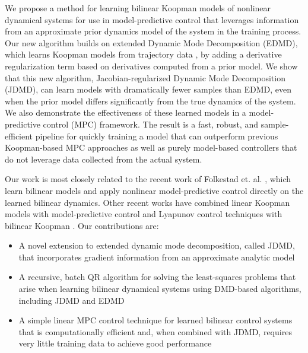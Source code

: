 \documentclass{article}
\begin{document}
We propose a method for learning bilinear Koopman models  of nonlinear
dynamical systems for use in model-predictive control that leverages information from an
approximate prior dynamics model of the system in the training process.  Our new algorithm
builds on extended Dynamic Mode Decomposition (EDMD), which learns Koopman models from
trajectory data \cite{Meduri2022,Bruder2021,Korda2018,Folkestad2020,Suh2020}, by adding a
derivative regularization term based on derivatives computed from a prior model.  We show
that this new algorithm, Jacobian-regularized Dynamic Mode Decomposition (JDMD), can learn
models with dramatically fewer samples than EDMD, even when the prior model differs
significantly from the true dynamics of the system.  We also demonstrate the effectiveness
of these learned models in a model-predictive control (MPC) framework.
The result is a fast, robust, and sample-efficient pipeline for quickly training a model
that can outperform previous Koopman-based MPC approaches as well as purely model-based
controllers that do not leverage data collected from the actual system.

Our work is most closely related to the recent work of Folkestad et. al.
\cite{Folkestad2020,Folkestad2021,Folkestad2021a}, which learn bilinear models and apply
nonlinear model-predictive control directly on the learned bilinear dynamics. Other recent
works have combined linear Koopman models with model-predictive control \cite{Korda2018} and
Lyapunov control techniques with bilinear Koopman \cite{Narasingam2022}. Our contributions
are:

\begin{itemize}
  \item A novel extension to extended dynamic mode decomposition, called JDMD, that
  incorporates gradient information from an approximate analytic model
  
  \item A recursive, batch QR algorithm for solving the least-squares problems that arise 
  when learning bilinear dynamical systems using DMD-based algorithms, including JDMD and EDMD
  
  \item A simple linear MPC control technique for learned bilinear control systems that is
  computationally efficient and, when combined with JDMD, requires very little training data
  to achieve good performance
\end{itemize}
\end{document}
